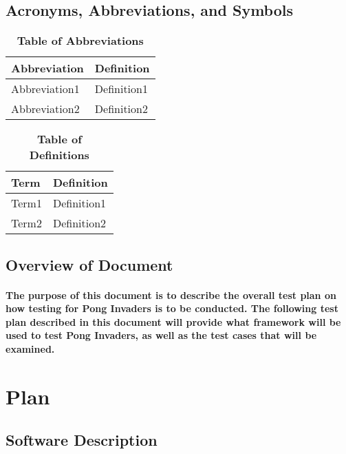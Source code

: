 \documentclass[12pt, titlepage]{article}
\begin{document}
\subsection{Acronyms, Abbreviations, and Symbols}
	
\begin{table}[hbp]
\caption{\textbf{Table of Abbreviations}} \label{Table}

\begin{tabularx}{\textwidth}{p{3cm}X}
\toprule
\textbf{Abbreviation} & \textbf{Definition} \\
\midrule
Abbreviation1 & Definition1\\
Abbreviation2 & Definition2\\
\bottomrule
\end{tabularx}

\end{table}

\begin{table}[!htbp]
\caption{\textbf{Table of Definitions}} \label{Table}

\begin{tabularx}{\textwidth}{p{3cm}X}
\toprule
\textbf{Term} & \textbf{Definition}\\
\midrule
Term1 & Definition1\\
Term2 & Definition2\\
\bottomrule
\end{tabularx}

\end{table}	

\subsection{Overview of Document}
\paragraph{The purpose of this document is to describe the overall test plan on
how testing for Pong Invaders is to be conducted. The following test plan
described in this document will provide what framework will be used to test
Pong Invaders, as well as the test cases that will be examined.}

\section{Plan}
	
\subsection{Software Description}
\end{document}
